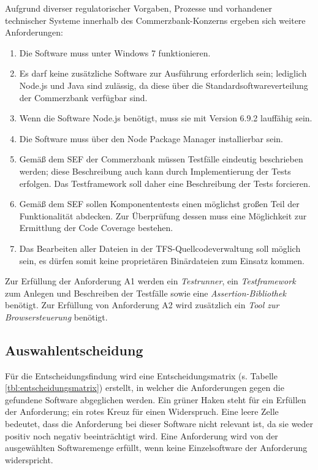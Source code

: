 \newpage
Aufgrund diverser regulatorischer Vorgaben, Prozesse und vorhandener technischer Systeme innerhalb des Commerzbank-Konzerns ergeben sich weitere Anforderungen:
\begin{enumerate}[label=\textbf{CB\arabic*}]
	\item Die Software muss unter Windows 7 funktionieren.
	\item Es darf keine zusätzliche Software zur Ausführung erforderlich sein; lediglich Node.js und Java sind zulässig, da diese über die Standardsoftwareverteilung der Commerzbank verfügbar sind.
	\item Wenn die Software Node.js benötigt, muss sie mit Version 6.9.2 lauffähig sein.
	\item Die Software muss über den Node Package Manager installierbar sein.
	\item Gemäß dem SEF der Commerzbank müssen Testfälle eindeutig beschrieben werden; diese Beschreibung auch kann durch Implementierung der Tests erfolgen\cite{coba-sef}. Das Testframework soll daher eine Beschreibung der Tests forcieren.
	\item Gemäß dem SEF sollen Komponententests \glqq einen möglichst großen Teil der Funktionalität abdecken\grqq{}\cite{coba-sef}. Zur Überprüfung dessen muss eine Möglichkeit zur Ermittlung der Code Coverage bestehen.
	\item Das Bearbeiten aller Dateien in der TFS-Quellcodeverwaltung soll möglich sein, es dürfen somit keine proprietären Binärdateien zum Einsatz kommen.
\end{enumerate}

Zur Erfüllung der Anforderung A1 werden ein \textit{Testrunner}, ein \textit{Testframework} zum Anlegen und Beschreiben der Testfälle sowie eine \textit{Assertion-Bibliothek} benötigt. Zur Erfüllung von Anforderung A2 wird zusätzlich ein \textit{Tool zur Browsersteuerung} benötigt.

\newpage


\newpage
\subsection{Auswahlentscheidung}
\label{sec:auswahlentscheidung}
Für die Entscheidungsfindung wird eine Entscheidungsmatrix (s. Tabelle \ref{tbl:entscheidungsmatrix}) erstellt, in welcher die Anforderungen gegen die gefundene Software abgeglichen werden. Ein grüner Haken steht für ein Erfüllen der Anforderung; ein rotes Kreuz für einen Widerspruch. Eine leere Zelle bedeutet, dass die Anforderung bei dieser Software nicht relevant ist, da sie weder positiv noch negativ beeinträchtigt wird. Eine Anforderung wird von der ausgewählten Softwaremenge erfüllt, wenn keine Einzelsoftware der Anforderung widerspricht.

